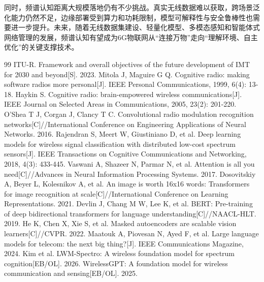 \documentclass[UTF8,fontset=windows,zihao=-4]{ctexart}
\begin{document}
同时，频谱认知距离大规模落地仍有不少挑战。真实无线数据难以获取，跨场景泛化能力仍然不足，边缘部署受到算力和功耗限制，模型可解释性与安全鲁棒性也需要进一步提升。未来，随着无线数据集建设、轻量化模型、多模态感知和智能体式网络管理的发展，频谱认知有望成为6G物联网从“连接万物”走向“理解环境、自主优化”的关键支撑技术。

\clearpage
\begin{thebibliography}{99}
 ITU-R. Framework and overall objectives of the future development of IMT for 2030 and beyond[S]. 2023.
 Mitola J, Maguire G Q. Cognitive radio: making software radios more personal[J]. IEEE Personal Communications, 1999, 6(4): 13-18.
 Haykin S. Cognitive radio: brain-empowered wireless communications[J]. IEEE Journal on Selected Areas in Communications, 2005, 23(2): 201-220.
 O'Shea T J, Corgan J, Clancy T C. Convolutional radio modulation recognition networks[C]//International Conference on Engineering Applications of Neural Networks. 2016.
 Rajendran S, Meert W, Giustiniano D, et al. Deep learning models for wireless signal classification with distributed low-cost spectrum sensors[J]. IEEE Transactions on Cognitive Communications and Networking, 2018, 4(3): 433-445.
 Vaswani A, Shazeer N, Parmar N, et al. Attention is all you need[C]//Advances in Neural Information Processing Systems. 2017.
 Dosovitskiy A, Beyer L, Kolesnikov A, et al. An image is worth 16x16 words: Transformers for image recognition at scale[C]//International Conference on Learning Representations. 2021.
 Devlin J, Chang M W, Lee K, et al. BERT: Pre-training of deep bidirectional transformers for language understanding[C]//NAACL-HLT. 2019.
 He K, Chen X, Xie S, et al. Masked autoencoders are scalable vision learners[C]//CVPR. 2022.
 Maatouk A, Piovesan N, Ayed F, et al. Large language models for telecom: the next big thing?[J]. IEEE Communications Magazine, 2024.
 Kim et al. LWM-Spectro: A wireless foundation model for spectrum cognition[EB/OL]. 2026.
 WirelessGPT: A foundation model for wireless communication and sensing[EB/OL]. 2025.
\end{thebibliography}
\end{document}

